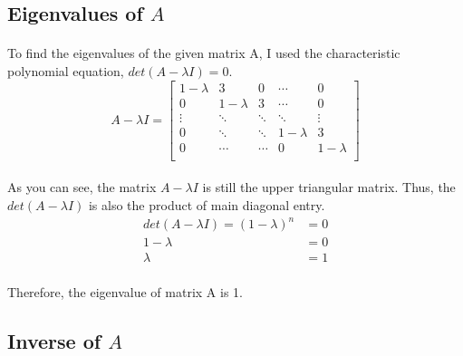 \documentclass[a4paper]{article}
\begin{document}
\subsection*{Eigenvalues of $A$}
\paragraph{}
To find the eigenvalues of the given matrix A, I used the characteristic polynomial equation, $det(A-\lambda I)=0$.
\begin{equation*}
A-\lambda I =
\begin{bmatrix}
   1-\lambda & 3 & 0 & \cdots & 0 \\
   0 & 1-\lambda & 3 & \cdots & 0 \\ 
   \vdots & \ddots & \ddots & \ddots & \vdots\\
   0 & \ddots &\ddots & 1-\lambda & 3 \\
   0 & \cdots &\cdots & 0 & 1-\lambda\\
\end{bmatrix}
\end{equation*}
\paragraph{}
As you can see, the matrix $A-\lambda I$ is still the upper triangular matrix. Thus, the $det(A-\lambda I)$ is also the product of main diagonal entry.
\begin{equation*}
\begin{split}
det(A-\lambda I) = (1-\lambda)^n &=0\\
1 - \lambda & = 0\\
\lambda &= 1    
\end{split}
\end{equation*}
\paragraph{}
Therefore, the eigenvalue of matrix A is 1.

\subsection*{Inverse of $A$}
\end{document}
